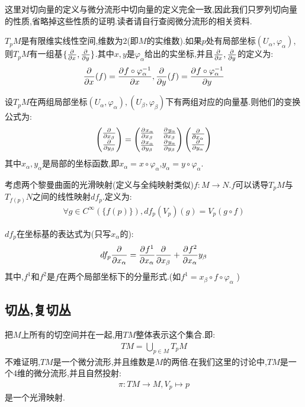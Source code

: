 这里对切向量的定义与微分流形中切向量的定义完全一致,因此我们只罗列切向量的性质,省略掉这些性质的证明.读者请自行查阅微分流形的相关资料.
\begin{proposition}
	$T_pM$是有限维实线性空间,维数为$2$(即$M$的实维数).如果$p$处有局部坐标$(U_\alpha,\varphi_\alpha)$,则$T_pM$有一组基$\{\frac{\partial^{} }{\partial {x}^{}},\frac{\partial^{} }{\partial {y}^{}}\}$.其中$x,y$是$\varphi_\alpha$给出的实坐标,并且$\frac{\partial^{} }{\partial {x}^{}},\frac{\partial^{} }{\partial {y}^{}}$的定义为:
	\begin{align*}
		\frac{\partial^{} }{\partial {x}^{}}(f)=\frac{\partial^{} f\circ \varphi_\alpha^{-1}}{\partial {x}^{}},\frac{\partial^{} }{\partial {y}^{}}(f)=\frac{\partial^{} f\circ \varphi_\alpha^{-1}}{\partial {y}^{}}
	\end{align*}
\end{proposition}
\begin{proposition}
	设$T_pM$在两组局部坐标$(U_\alpha,\varphi_\alpha),(U_\beta,\varphi_\beta)$下有两组对应的向量基.则他们的变换公式为:
	\begin{align*}
		\begin{pmatrix}
			\frac{\partial^{} }{\partial {x_\beta}^{}}\\
			\frac{\partial^{} }{\partial {y_\beta}^{}}
		\end{pmatrix}=\begin{pmatrix}
			\frac{\partial^{} x_\alpha}{\partial {x_\beta}^{}}&\frac{\partial^{} y_\alpha}{\partial {x_\beta}^{}}\\
			\frac{\partial^{} x_\alpha}{\partial {y_\beta}^{}}&\frac{\partial^{} y_\alpha}{\partial {y_\beta}^{}}\end{pmatrix}\begin{pmatrix}
				\frac{\partial^{} }{\partial {x_\alpha}^{}}\\
				\frac{\partial^{} }{\partial {y_\alpha}^{}}
			\end{pmatrix}
	\end{align*}
	其中$x_\alpha,y_\alpha$是局部的坐标函数,即$x_\alpha=x\circ \varphi_\alpha$,$y_\alpha=y \circ \varphi_\alpha$.
\end{proposition}
\begin{proposition}[切映射]
	考虑两个黎曼曲面的光滑映射(定义与全纯映射类似)$f:M \to N$.$f$可以诱导$T_pM$与$T_{f(p)}N$之间的线性映射$df_p$.定义为:
	\begin{align*}
		\forall g \in C^\infty(\{f(p)\}),df_p(V_p)(g)=V_p(g \circ f)
	\end{align*}

	$df_p$在坐标基的表达式为(只写$x_\alpha$的):
	\begin{align*}
		df_p \frac{\partial^{} }{\partial {x_\alpha}^{}}=\frac{\partial^{} f^1}{\partial {x_\alpha}^{}}\frac{\partial^{} }{\partial {x_\beta}^{}}+\frac{\partial^{} f^2}{\partial {x_\alpha}^{}}{y_\beta}
	\end{align*}
	其中,$f^1$和$f^2$是$f$在两个局部坐标下的分量形式.(如$f^1=x_\beta \circ f \circ \varphi_\alpha$ )
\end{proposition}
\subsection*{切丛,复切丛}
把$M$上所有的切空间并在一起,用$TM$整体表示这个集合.即:
\begin{align*}
	TM=\bigcup_{p \in M}T_pM
\end{align*}
不难证明,$TM$是一个微分流形,并且维数是$M$的两倍.在我们这里的讨论中,$TM$是一个4维的微分流形,并且自然投射:
\begin{align*}
	\pi:TM \to M,V_p \mapsto p
\end{align*}
是一个光滑映射.
\ifx\allfiles\undefined
	
	
	
	
	\else
	\fi